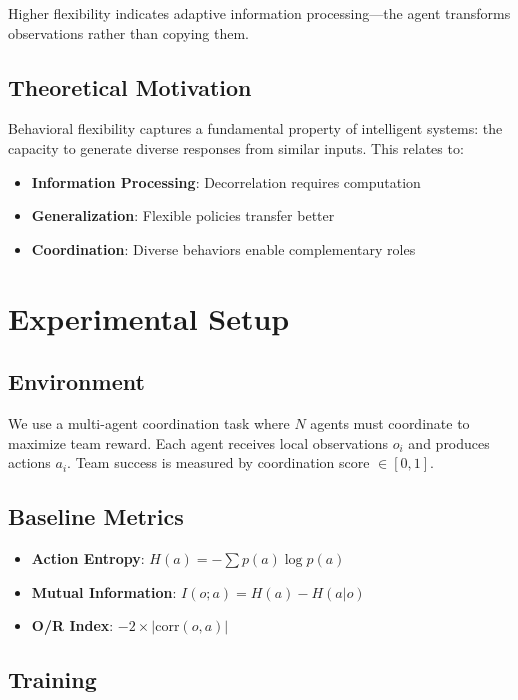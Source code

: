 \documentclass[twoside]{article}
\begin{document}
Higher flexibility indicates adaptive information processing—the agent transforms observations rather than copying them.

\subsection{Theoretical Motivation}

Behavioral flexibility captures a fundamental property of intelligent systems: the capacity to generate diverse responses from similar inputs. This relates to:

\begin{itemize}
    \item \textbf{Information Processing}: Decorrelation requires computation
    \item \textbf{Generalization}: Flexible policies transfer better
    \item \textbf{Coordination}: Diverse behaviors enable complementary roles
\end{itemize}

\section{Experimental Setup}

\subsection{Environment}

We use a multi-agent coordination task where $N$ agents must coordinate to maximize team reward. Each agent receives local observations $o_i$ and produces actions $a_i$. Team success is measured by coordination score $\in [0, 1]$.

\subsection{Baseline Metrics}

\begin{itemize}
    \item \textbf{Action Entropy}: $H(a) = -\sum p(a) \log p(a)$
    \item \textbf{Mutual Information}: $I(o; a) = H(a) - H(a|o)$
    \item \textbf{O/R Index}: $-2 \times |\text{corr}(o, a)|$
\end{itemize}

\subsection{Training}
\end{document}
